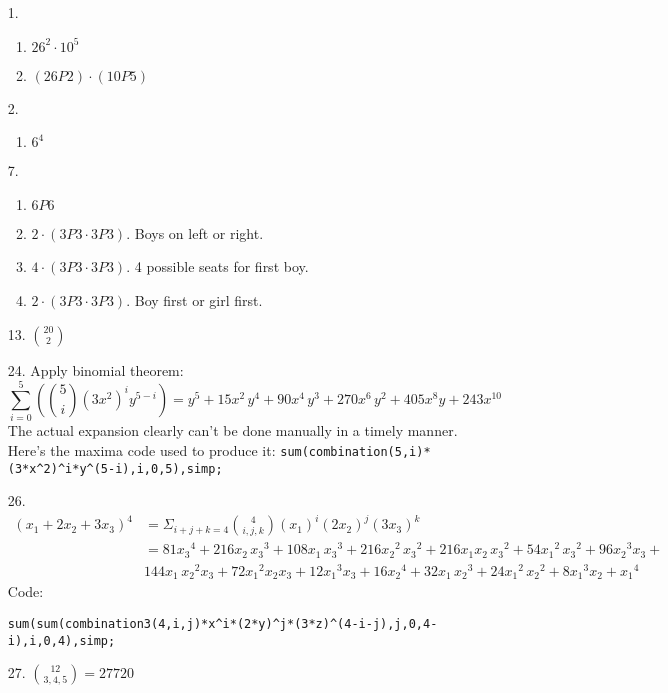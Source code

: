 \documentclass{article}
\begin{document}
\begin{itemize}
\item[1.]
  \begin{enumerate}[label=(\alph*)]
  \item $26^2\cdot 10^5$
  \item $(26P2)\cdot(10P5)$
  \end{enumerate}
\item [2.]
  \begin{enumerate}[label=(\alph*)]
  \item $6^4$
  \end{enumerate}
\item [7.]
  \begin{enumerate}[label=(\alph*)]
  \item $6P6$
  \item $2\cdot(3P3\cdot3P3)$. Boys on left or right.
  \item $4\cdot(3P3\cdot3P3)$. 4 possible seats for first boy.
  \item $2\cdot(3P3\cdot3P3)$. Boy first or girl first.
  \end{enumerate}
\item [13.] ${20}\choose{2}$
\item [24.] Apply binomial theorem:
  \[\sum_{i=0}^{5}({5\choose i} {(3x^2)}^{i}y^{5-i})=
  {{y}^{5}}+15 {{x}^{2}}\, {{y}^{4}}+90 {{x}^{4}}\, {{y}^{3}}+270 {{x}^{6}}\, {{y}^{2}}+405 {{x}^{8}} y+243 {{x}^{10}}\]
The actual expansion clearly can't be done manually in a timely manner. Here's the maxima code used to produce it: \lstinline|sum(combination(5,i)*(3*x^2)^i*y^(5-i),i,0,5),simp;|
\item [26.]
  \begin{equation*}
    \begin{split}
      (x_1+2x_2+3x_3)^4 &=
      \Sigma_{i+j+k=4}{4 \choose i,j,k}(x_1)^i(2x_2)^j(3x_3)^k\\
      &=81 {{x_3}^{4}}+216 x_2\, {{x_3}^{3}}+108 x_1\, {{x_3}^{3}}+216 {{x_2}^{2}}\, {{x_3}^{2}}+216 x_1 x_2\, {{x_3}^{2}}+ 54 {{x_1}^{2}}\, {{x_3}^{2}}+ 96 {{x_2}^{3}} x_3+ \\& 144 x_1\, {{x_2}^{2}} x_3+72 {{x_1}^{2}} x_2 x_3+ 12 {{x_1}^{3}} x_3+16 {{x_2}^{4}}+32 x_1\, {{x_2}^{3}}+24 {{x_1}^{2}}\, {{x_2}^{2}}+8 {{x_1}^{3}} x_2+{{x_1}^{4}}
\end{split}
\end{equation*}
  Code:
\begin{lstlisting}
sum(sum(combination3(4,i,j)*x^i*(2*y)^j*(3*z)^(4-i-j),j,0,4-i),i,0,4),simp;
\end{lstlisting}

\item [27.] ${12\choose3,4,5}=27720$


\end{itemize}
\end{document}
